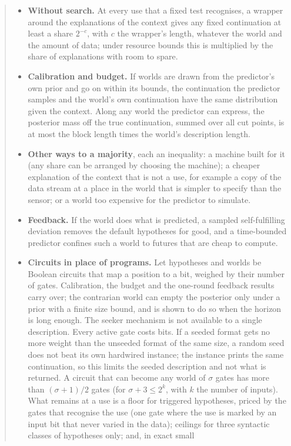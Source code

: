 \documentclass[11pt]{article}
\theoremstyle{definition}
\begin{document}
\begin{abstract}
\begin{itemize}[leftmargin=1.4em,itemsep=1pt,topsep=2pt]
\item \textbf{Without search.} At every use that a fixed test recognises, a wrapper around the explanations
of the context gives any fixed continuation at least a share $2^{-c}$, with $c$ the wrapper's length,
whatever the world and the amount of data; under resource bounds this is multiplied by the share of
explanations with room to spare.
\item \textbf{Calibration and budget.} If worlds are drawn from the predictor's own prior and go on within
its bounds, the continuation the predictor samples and the world's own continuation have the same
distribution given the context. Along any world the predictor can express, the posterior mass off the true
continuation, summed over all cut points, is at most the block length times the world's description length.
\item \textbf{Other ways to a majority}, each an inequality: a machine built for it (any share can be
arranged by choosing the machine); a cheaper explanation of the context that is not a use, for example a copy
of the data stream at a place in the world that is simpler to specify than the sensor; or a world too
expensive for the predictor to simulate.
\item \textbf{Feedback.} If the world does what is predicted, a sampled self-fulfilling deviation removes the
default hypotheses for good, and a time-bounded predictor confines such a world to futures that are cheap to
compute.
\item \textbf{Circuits in place of programs.} Let hypotheses and worlds be Boolean circuits that map a
position to a bit, weighed by their number of gates. Calibration, the budget and the one-round feedback
results carry over; the contrarian world can empty the posterior only under a prior with a finite size
bound, and is shown to do so when the horizon is long enough. The seeker mechanism is not available to a
single description. Every active gate
costs bits. If a seeded format gets no more weight than the unseeded format of the same size, a random seed
does not beat its own hardwired instance; the instance prints the same continuation, so this limits the
seeded description and not
what is returned. A circuit that can become any world of $\sigma$ gates has more than $(\sigma+1)/2$ gates
(for $\sigma+3\le2^k$, with $k$ the number of inputs). What remains at a use is a floor for triggered
hypotheses, priced by the gates that recognise the use (one gate where the use is marked by an input bit
that never varied in the data); ceilings for three syntactic classes of hypotheses only; and, in exact small

\end{itemize}
\end{abstract}
\end{document}
